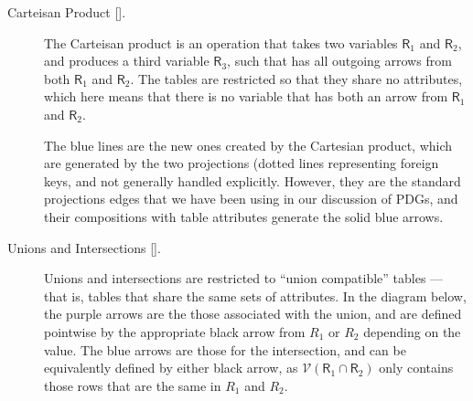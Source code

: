 \documentclass{article}
\theoremstyle{definition}
\theoremstyle{remark}
\newcommand{\V}{\mathcal V}
\newcommand{\var}[1]{\mathsf{#1}}
\begin{document}
\begin{description}
\item[{Carteisan Product [].}]
The Carteisan product is an operation that takes two variables $\var R_1$ and $\var R_2$, and produces a third variable $\var R_3$, such that has all outgoing arrows from both $\var R_1$ and $\var R_2.$  The tables are restricted so that they share no attributes, which here means that there is no variable that has both an arrow from $\var R_1$ and $\var R_2$.

The blue lines are the new ones created by the Cartesian product, which are generated by the two projections (dotted lines representing foreign keys, and not generally handled explicitly. However, they are the standard projections edges that we have been using in our discussion of PDGs, and their compositions with table attributes generate the solid blue arrows.

\item[{Unions and Intersections  [].}]
Unions and intersections are restricted to ``union compatible'' tables --- that is, tables that share the same sets of attributes. 
In the diagram below, the purple arrows are the those associated with the union, and are defined pointwise by the appropriate black arrow from $R_1$ or $R_2$ depending on the value. The blue arrows are those for the intersection, and can be equivalently defined by either black arrow, as $\V(\var R_1 \cap \var R_2)$ only contains those rows that are the same in $R_1$ and $R_2$.
\begin{figure}
	\begin{subfigure}{0.41\textwidth}
\end{subfigure}
\end{figure}
\end{description}
\end{document}
